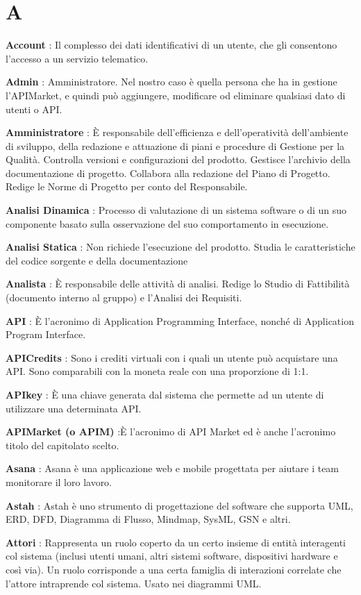 \documentclass[12pt,a4paper,titlepage]{article}
\begin{document}
\newpage	

\section{A}
\begin{trivlist}
\item \textbf{Account} : Il complesso dei dati identificativi di un utente, che gli consentono l'accesso a un servizio telematico.
\item \textbf{Admin} : Amministratore. Nel nostro caso è quella persona che ha in gestione l'APIMarket, e quindi può aggiungere, modificare od eliminare qualsiasi dato di utenti o API.
\item \textbf{Amministratore} : È responsabile dell'efficienza e dell'operatività dell'ambiente di sviluppo, della redazione e attuazione di piani e procedure di Gestione per la Qualità. Controlla versioni e configurazioni del prodotto. Gestisce l'archivio della documentazione di progetto. Collabora alla redazione del Piano di Progetto. Redige le Norme di Progetto per conto del Responsabile.
\item \textbf{Analisi Dinamica} : Processo di valutazione di un sistema software o di un suo componente basato sulla osservazione del suo comportamento in esecuzione.
\item \textbf{Analisi Statica} : Non richiede l'esecuzione del prodotto. Studia le caratteristiche del codice sorgente e della documentazione
\item \textbf{Analista} : È responsabile delle attività di analisi. Redige lo Studio di Fattibilità (documento interno al gruppo) e l'Analisi dei Requisiti.
\item \textbf{API} : È l'acronimo di Application Programming Interface, nonché di Application Program Interface.
\item \textbf{APICredits} : Sono i crediti virtuali con i quali un utente può acquistare una API. Sono comparabili con la moneta reale con una proporzione di 1:1.
\item \textbf{APIkey} : È una chiave generata dal sistema che permette ad un utente di utilizzare una determinata API.
\item \textbf{APIMarket (o APIM)} :È l'acronimo di API Market ed è anche l'acronimo titolo del capitolato scelto.
\item \textbf{Asana} : Asana è una applicazione web e mobile progettata per aiutare i team monitorare il loro lavoro.
\item \textbf{Astah} : Astah è uno strumento di progettazione del software che supporta UML, ERD, DFD, Diagramma di Flusso, Mindmap, SysML, GSN e altri.
\item \textbf{Attori} : Rappresenta un ruolo coperto da un certo insieme di entità interagenti col sistema (inclusi utenti umani, altri sistemi software, dispositivi hardware e così via). Un ruolo corrisponde a una certa famiglia di interazioni correlate che l'attore intraprende col sistema. Usato nei diagrammi UML.
\end{trivlist}
\end{document}
